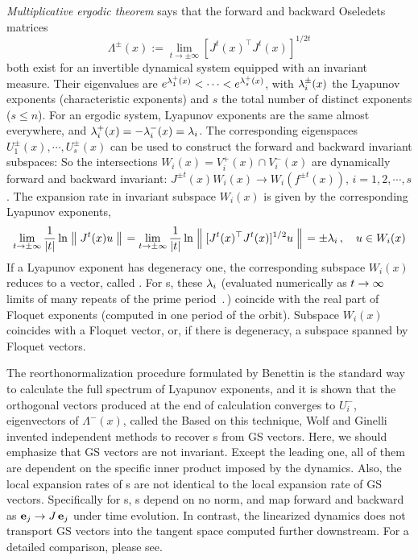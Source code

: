\documentclass[final,leqno,onefignum,onetabnum]{siamltexmm}
\begin{document}
\emph{Multiplicative ergodic theorem} says that the forward and backward
Oseledets matrices
\begin{equation}
\Lambda^{\pm}(x) :=\lim_{t\to\pm\infty}[J^t(x)^\top J^{t}(x)]^{1/2t}
\label{eq:oseledets}
\end{equation}
both exist for an invertible dynamical system equipped with an invariant measure.
Their eigenvalues are
$e^{\Lyap^{+}_1(x)}<\cdots<e^{\Lyap^{+}_s(x)}$,
with $\Lyap^{\pm}_i(x)$ the
Lyapunov exponents (characteristic exponents) and $s$
the total number of distinct exponents ($s\le n$). For an ergodic system,
Lyapunov exponents are the same almost everywhere, and
$\Lyap^{+}_i(x)=-\Lyap^{-}_{i}(x)=\Lyap_i$.
The corresponding eigenspaces
$U^\pm_1(x), \cdots, U^\pm_s(x)$
can be used to construct the forward and backward invariant subspaces:
 So the intersections $W_i(x)=V^+_i(x)\cap V^-_i(x)$ are dynamically
forward and backward invariant: $J^{\pm t}(x)W_i(x) \to W_i(f^{\pm t}(x))$,
$i = 1, 2,\cdots,s$.
The expansion rate in invariant subspace $W_i(x)$ is given
by the corresponding Lyapunov exponents,
\begin{equation}
  \label{eq:lyapunov}
  \lim_{t\to\pm\infty}\frac{1}{|t|}\ln\norm{J^t(x)u}
  =\lim_{t\to\pm\infty}\frac{1}{|t|}\ln\norm{[J^t(x)^\top J^t(x)]^{1/2}u}
  = \pm\Lyap_i
  \,,\quad  u\in W_i(x)
\end{equation}
If a Lyapunov exponent has degeneracy one, the corresponding
subspace $W_i(x)$ reduces to a vector, called \edit{\emph{\cLv}}.
For \po s, these $\Lyap_i$
(evaluated numerically as $\zeit\to\infty$ limits of many repeats of the
prime period $\period{}$) coincide with the real part of Floquet exponents
(computed in one period of the orbit). Subspace $W_i(x)$ coincides with
a Floquet vector, or, if there is degeneracy, a subspace
spanned by Floquet vectors.

The reorthonormalization procedure
formulated by Benettin \edit{\etal}
is
the standard way to calculate the full spectrum of Lyapunov exponents,
and it is shown
that the orthogonal vectors produced at the end of
calculation converges to $U_i^{-}$, eigenvectors of $\Lambda^{-}(x)$, called
the 
Based on this technique,
Wolf \edit{\etal} and
Ginelli \edit{\etal}
invented independent methods to recover \cLv s
from GS vectors. Here, we should emphasize that GS vectors are
not invariant. Except the leading one, all of them are dependent on
the specific inner product imposed by the dynamics. Also, the local expansion
rates of \cLv s are not
identical to the local expansion rate of GS vectors. Specifically for
\po s, \Fv s depend on no norm, and map forward and
backward as $\jEigvec[j] \to \jMps\,\jEigvec[j]$ under time evolution.
In contrast, the linearized dynamics does not transport GS vectors into
the tangent space computed further downstream. For a detailed
comparison, please see.
\end{document}
